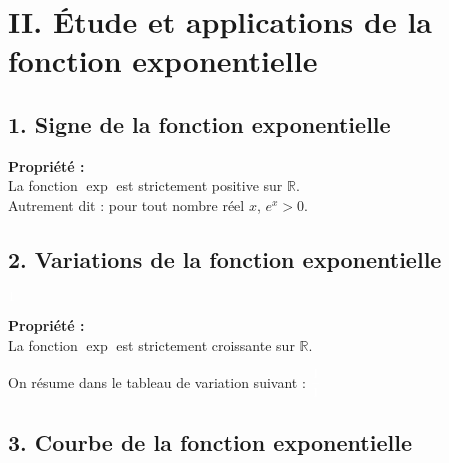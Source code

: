 \documentclass[11pt,a4paper]{article}
\begin{document}
\section*{II. Étude et applications de la fonction exponentielle}

\subsection*{1. Signe de la fonction exponentielle}

\begin{mdframed}[style=proprieteStyle]
    \textbf{Propriété :} ~\\
    La fonction $\exp$ est strictement positive sur $\mathbb{R}$. \\
    Autrement dit : pour tout nombre réel $x$, $e^x>0$.
\end{mdframed}

\subsection*{2. Variations de la fonction exponentielle}

\begin{minipage}[t]{0.35\textwidth} %
    $\displaystyle{\color{white}1}$
    \begin{mdframed}[style=proprieteStyle]
        \textbf{Propriété :} ~\\
        La fonction $\exp$ est strictement croissante sur $\mathbb{R}$.
    \end{mdframed}
\end{minipage}
\hspace{0.06\textwidth} %
\begin{minipage}[t]{0.6\textwidth} %
    On résume dans le tableau de variation suivant : $\displaystyle{\color{white}\frac{1}{1}}$ ~\\
\end{minipage}



\subsection*{3. Courbe de la fonction exponentielle}
\end{document}
